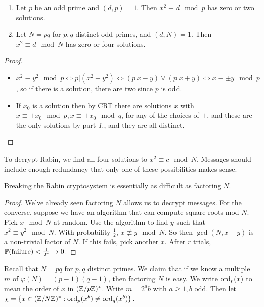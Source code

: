 \documentclass[10pt,a4paper]{article}
\begin{document}
\begin{lemma}
\item
\begin{enumerate}
\item Let $p$ be an odd prime and $(d,p) = 1$. Then $x^2 \equiv d \mod p$ has zero or two solutions.
\item Let $N = pq$ for $p,q$ distinct odd primes, and $(d,N) = 1$. Then $x^2 \equiv d \mod N$ has zero or four solutions.
\end{enumerate}
\end{lemma}
\begin{proof}
\item
\begin{itemize}
\item $x^2 \equiv y^2 \mod p \iff p|(x^2-y^2) \iff (p|x-y)\vee(p|x+y)\iff x \equiv \pm y \mod p$, so if there is a solution, there are two since $p$ is odd.
\item If $x_0$ is a solution then by CRT there are solutions $x$ with $x\equiv \pm x_0 \mod p, x \equiv \pm x_0 \mod q$, for any of the choices of $\pm$, and these are the only solutions by part \textit{1.}, and they are all distinct.
\end{itemize}
\end{proof}
To decrypt Rabin, we find all four solutions to $x^2 \equiv c \mod N$. Messages should include enough redundancy that only one of these possibilities makes sense.

\begin{theorem}
Breaking the Rabin cryptosystem is essentially as difficult as factoring $N$.
\end{theorem}
\begin{proof}
We've already seen factoring $N$ allows us to decrypt messages. For the converse, suppose we have an algorithm that can compute square roots mod $N$. Pick $x \mod N$ at random. Use the algorithm to find $y$ such that $x^2 \equiv y^2 \mod N$. With probability $\frac12$, $x \nequiv y \mod N$. So then $\gcd(N, x-y)$ is a non-trivial factor of $N$. If this fails, pick another $x$. After $r$ trials, $\P(\text{failure}) < \frac{1}{2^r} \to 0$.
\end{proof}

Recall that $N = pq$ for $p,q$ distinct primes. We claim that if we know a multiple $m$ of $\varphi(N) = (p-1)(q-1)$, then factoring $N$ is easy. We write $\ord_p(x)$ to mean the order of $x$ in $(\Z/p\Z)^\ast$. Write $m  = 2^a b$ with $a \geq 1, b$ odd. Then let $\chi = \{x \in (\Z/N\Z)^\ast : \ord_p(x^b) \neq \ord_q(x^b)\}$.
\end{document}
